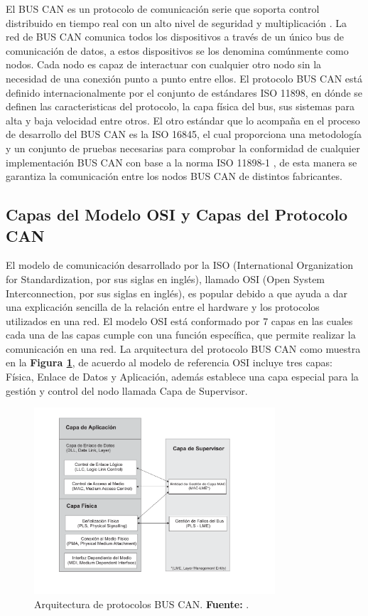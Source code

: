 El BUS CAN es un protocolo de comunicación serie que soporta control distribuido en tiempo real con un alto nivel de seguridad y multiplicación  \cite{PSMR}. La red de BUS CAN comunica todos los dispositivos a través de un único bus de comunicación de datos, a estos dispositivos se los denomina comúnmente como nodos. Cada nodo es capaz de interactuar con cualquier otro nodo sin la necesidad de una conexión punto a punto entre ellos.
El protocolo BUS CAN está definido internacionalmente por el conjunto de estándares ISO 11898, en dónde se definen las caracteristicas del protocolo, la capa física del bus, sus sistemas para alta y baja velocidad entre otros. El otro estándar que lo acompaña en el proceso de desarrollo del BUS CAN es la ISO 16845, el cual proporciona una  metodología y un conjunto de pruebas necesarias para comprobar la conformidad de cualquier implementación BUS CAN con base a la norma ISO 11898-1 \cite{ISO}, de esta manera se garantiza la comunicación entre los nodos BUS CAN de distintos fabricantes.

\subsection {Capas del Modelo OSI y Capas del Protocolo CAN}
El modelo de comunicación desarrollado por la ISO (International Organization for Standardization, por sus siglas en inglés), llamado OSI (Open System Interconnection, por sus siglas en inglés), es popular debido a que ayuda a dar una explicación  sencilla de la relación entre el hardware  y los protocolos utilizados en una red. El modelo OSI está conformado por 7 capas en las cuales cada una de las capas cumple con una función específica, que permite realizar la comunicación en una red.
La arquitectura del protocolo BUS CAN como muestra en la \textbf{Figura \ref{ABC}}, de acuerdo al modelo de referencia OSI incluye tres capas: Física, Enlace de Datos y Aplicación, además establece una capa especial para la gestión y control del nodo llamada Capa de Supervisor. 


\begin{figure}[H]
	\centering
		\includegraphics[width=0.8\textwidth]{./Cap2imagen/protocolocan.pdf}
	\caption[Arquitectura de protocolos BUS CAN.]{Arquitectura de protocolos BUS CAN.\textbf{ Fuente:} \cite{DSEEPC}.}
	\label{ABC} %
\end{figure}

